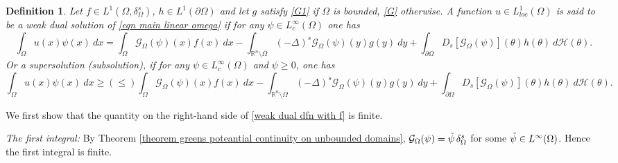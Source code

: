 \documentclass{amsart}
\newtheorem{definition}[theorem]{Definition}
\newcommand{\R}{\mathbb{R}}
\newcommand{\slap}{(-\Delta)^{s}}
\newcommand{\g}[1]{\mathcal{G}_{#1}}
\newcommand{\Ds}{D_{s}}
\begin{document}
 \begin{definition}\label{Dfn weak dual solution with f,g,h}
      Let $f\in L^{1}(\Omega,\delta^{s}_{\Omega})$, $h\in L^{1}(\partial\Omega)$ and let $g$ satisfy \ref{G1} if $\Omega$ is bounded, \ref{G} otherwise.  A function $u\in L^{1}_{loc}(\Omega)$ is said to be a weak dual solution of \eqref{eqn main linear omega}
        if for any $\psi\in L^{\infty}_{c}(\Omega)$ one has
    \begin{equation}\label{weak dual dfn with f}
        \int_{\Omega}u(x)\psi(x)\ dx=\int_{\Omega}\g{\Omega}(\psi)(x) f(x)\ dx-\int_{\R^{n}\setminus\overline{\Omega}
        }\slap \g{\Omega}(\psi)(y) g(y) \ dy+\int_{\partial\Omega
        } \Ds [\g{\Omega}(\psi)](\theta) h(\theta) \ d\mathcal{H}(\theta).
    \end{equation}
    Or a supersolution (subsolution), if  for any $\psi\in L^{\infty}_{c}(\Omega)$ and  $\psi\geq 0$, one has
    \begin{equation*}
         \int_{\Omega}u(x)\psi(x)\ dx\geq (\leq)\int_{\Omega}\g{\Omega}(\psi)(x) f(x)\ dx-\int_{\R^{n}\setminus\overline{\Omega}
        }\slap \g{\Omega}(\psi)(y) g(y) \ dy+\int_{\partial\Omega
        } \Ds [\g{\Omega}(\psi)](\theta) h(\theta) \ d\mathcal{H}(\theta).
    \end{equation*}
    \end{definition}
    We first show that the quantity on the right-hand side of \eqref{weak dual dfn with f} is finite.
\medskip 

    \textit{The first integral:}
    By Theorem \ref{theorem greens poteantial continuity on unbounded domains}, $\g{\Omega}(\psi)=\Tilde{\psi} \, \delta_{\Omega}^{s}$ for some $\Tilde{\psi}\in L^{\infty}(\Omega)$. Hence the first integral is finite.
\smallskip 
\end{document}
